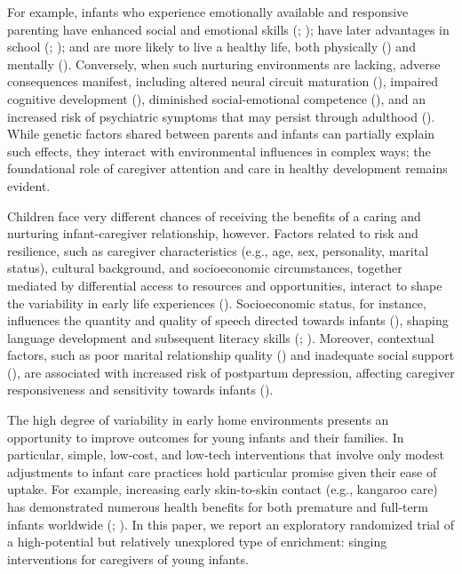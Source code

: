 \documentclass[
]{article}
\begin{document}
For example, infants who experience emotionally available and responsive
parenting have enhanced social and emotional skills
(;
); have later advantages
in school (;
); and are
more likely to live a healthy life, both physically
() and mentally
(). Conversely, when such
nurturing environments are lacking, adverse consequences manifest,
including altered neural circuit maturation (), impaired cognitive development
(), diminished
social-emotional competence (), and an increased risk of psychiatric symptoms that may persist
through adulthood ().
While genetic factors shared between parents and infants can partially
explain such effects, they interact with environmental influences in
complex ways; the foundational role of caregiver attention and care in
healthy development remains evident.

Children face very different chances of receiving the benefits of a
caring and nurturing infant-caregiver relationship, however. Factors
related to risk and resilience, such as caregiver characteristics (e.g.,
age, sex, personality, marital status), cultural background, and
socioeconomic circumstances, together mediated by differential access to
resources and opportunities, interact to shape the variability in early
life experiences ().
Socioeconomic status, for instance, influences the quantity and quality
of speech directed towards infants (), shaping language development and subsequent literacy
skills (;
). Moreover,
contextual factors, such as poor marital relationship quality
() and inadequate social
support (), are associated
with increased risk of postpartum depression, affecting caregiver
responsiveness and sensitivity towards infants
().

The high degree of variability in early home environments presents an
opportunity to improve outcomes for young infants and their families. In
particular, simple, low-cost, and low-tech interventions that involve
only modest adjustments to infant care practices hold particular promise
given their ease of uptake. For example, increasing early skin-to-skin
contact (e.g., kangaroo care) has demonstrated numerous health benefits
for both premature and full-term infants worldwide
(;
). In this paper, we report
an exploratory randomized trial of a high-potential but relatively
unexplored type of enrichment: singing interventions for caregivers of
young infants.
\end{document}
